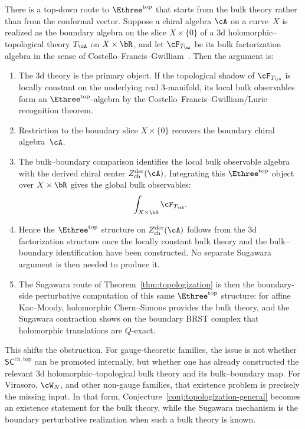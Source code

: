 \begin{remark}
There is a top-down route to $\Ethree^{\mathrm{top}}$ that starts from
the bulk theory rather than from the conformal vector. Suppose a
chiral algebra $\cA$ on a curve~$X$ is realized as the boundary
algebra on the slice $X \times \{0\}$ of a $3$d
holomorphic--topological theory $T_\cA$ on $X \times \bR$, and let
$\cF_{T_\cA}$ be its bulk factorization algebra in the sense of
Costello--Francis--Gwilliam~\cite{CFG25}. Then the argument is:
\begin{enumerate}[label=\textup{(\roman*)}]
\item The $3$d theory is the primary object. If the topological shadow
 of $\cF_{T_\cA}$ is locally constant on the underlying real
 $3$-manifold, its local bulk observables form an
 $\Ethree^{\mathrm{top}}$-algebra by the
 Costello--Francis--Gwilliam/Lurie recognition theorem.
\item Restriction to the boundary slice $X \times \{0\}$ recovers the
 boundary chiral algebra~$\cA$.
\item The bulk--boundary comparison identifies the local bulk
 observable algebra with the derived chiral center
 $Z^{\mathrm{der}}_{\mathrm{ch}}(\cA)$. Integrating this
 $\Ethree^{\mathrm{top}}$ object over $X \times \bR$ gives the
 global bulk observables:
 \[
 \int_{X \times \bR} \cF_{T_\cA}.
 \]
\item Hence the $\Ethree^{\mathrm{top}}$ structure on
 $Z^{\mathrm{der}}_{\mathrm{ch}}(\cA)$ follows from the $3$d
 factorization structure once the locally constant bulk theory and
 the bulk--boundary identification have been constructed. No
 separate Sugawara argument is then needed to produce it.
\item The Sugawara route of Theorem~\ref{thm:topologization} is then
 the boundary-side perturbative computation of this same
 $\Ethree^{\mathrm{top}}$ structure: for affine Kac--Moody,
 holomorphic Chern--Simons provides the bulk theory, and the
 Sugawara contraction shows on the boundary BRST complex that
 holomorphic translations are $Q$-exact.
\end{enumerate}

This shifts the obstruction. For gauge-theoretic families, the issue
is not whether $\mathsf{SC}^{\mathrm{ch,top}}$ can be promoted
internally, but whether one has already constructed the relevant $3$d
holomorphic--topological bulk theory and its bulk--boundary map. For
Virasoro, $\cW_N$, and other non-gauge families, that existence
problem is precisely the missing input. In that form,
Conjecture~\ref{conj:topologization-general} becomes an existence
statement for the bulk theory, while the Sugawara mechanism is the
boundary perturbative realization when such a bulk theory is known.
\end{remark}

